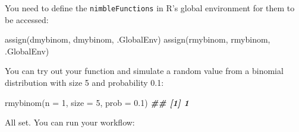 \documentclass[
  12pt,
]{krantz}
\newenvironment{Shaded}{\begin{snugshade}}{\end{snugshade}}
\newcommand{\AttributeTok}[1]{\textcolor[rgb]{0.77,0.63,0.00}{#1}}
\newcommand{\DecValTok}[1]{\textcolor[rgb]{0.00,0.00,0.81}{#1}}
\newcommand{\DocumentationTok}[1]{\textcolor[rgb]{0.56,0.35,0.01}{\textbf{\textit{#1}}}}
\newcommand{\FloatTok}[1]{\textcolor[rgb]{0.00,0.00,0.81}{#1}}
\newcommand{\FunctionTok}[1]{\textcolor[rgb]{0.00,0.00,0.00}{#1}}
\newcommand{\NormalTok}[1]{#1}
\newcommand{\StringTok}[1]{\textcolor[rgb]{0.31,0.60,0.02}{#1}}
\begin{document}
You need to define the \texttt{nimbleFunctions} in R's global environment for them to be accessed:

\begin{Shaded}
\begin{Highlighting}[]
\FunctionTok{assign}\NormalTok{(}\StringTok{\textquotesingle{}dmybinom\textquotesingle{}}\NormalTok{, dmybinom, .GlobalEnv)}
\FunctionTok{assign}\NormalTok{(}\StringTok{\textquotesingle{}rmybinom\textquotesingle{}}\NormalTok{, rmybinom, .GlobalEnv)}
\end{Highlighting}
\end{Shaded}

You can try out your function and simulate a random value from a binomial distribution with size 5 and probability 0.1:

\begin{Shaded}
\begin{Highlighting}[]
\FunctionTok{rmybinom}\NormalTok{(}\AttributeTok{n =} \DecValTok{1}\NormalTok{, }\AttributeTok{size =} \DecValTok{5}\NormalTok{, }\AttributeTok{prob =} \FloatTok{0.1}\NormalTok{)}
\DocumentationTok{\#\# [1] 1}
\end{Highlighting}
\end{Shaded}

All set. You can run your workflow:
\end{document}
